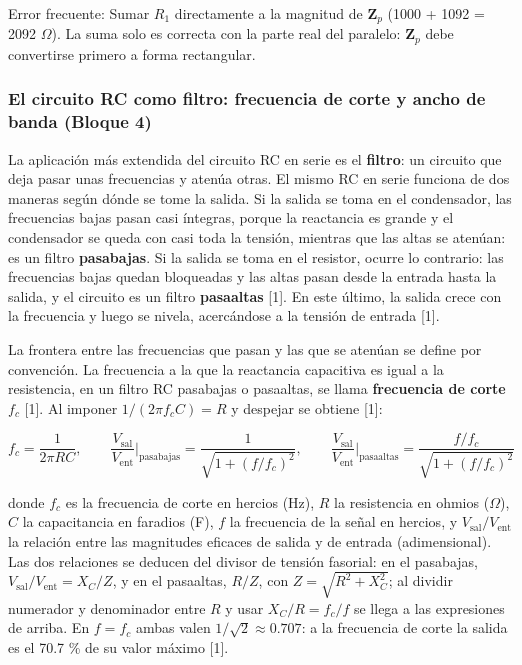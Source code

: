 \documentclass[11pt,letterpaper]{article}
\begin{document}
\begin{nota}{Error frecuente:}
Sumar $R_1$ directamente a la magnitud de $\mathbf{Z}_p$ (1000 + 1092 = 2092 \ensuremath{\Omega}). La suma solo es correcta con la parte real del paralelo: $\mathbf{Z}_p$ debe convertirse primero a forma rectangular.
\end{nota}

\subsubsection{El circuito RC como filtro: frecuencia de corte y ancho de banda (Bloque 4)}

La aplicación más extendida del circuito RC en serie es el \textbf{filtro}: un circuito que deja pasar unas frecuencias y atenúa otras. El mismo RC en serie funciona de dos maneras según dónde se tome la salida. Si la salida se toma en el condensador, las frecuencias bajas pasan casi íntegras, porque la reactancia es grande y el condensador se queda con casi toda la tensión, mientras que las altas se atenúan: es un filtro \textbf{pasabajas}. Si la salida se toma en el resistor, ocurre lo contrario: las frecuencias bajas quedan bloqueadas y las altas pasan desde la entrada hasta la salida, y el circuito es un filtro \textbf{pasaaltas} [1]. En este último, la salida crece con la frecuencia y luego se nivela, acercándose a la tensión de entrada [1].

La frontera entre las frecuencias que pasan y las que se atenúan se define por convención. La frecuencia a la que la reactancia capacitiva es igual a la resistencia, en un filtro RC pasabajas o pasaaltas, se llama \textbf{frecuencia de corte} $f_c$ [1]. Al imponer $1/(2\pi f_c C) = R$ y despejar se obtiene [1]:

\begin{equation}
  f_c = \frac{1}{2\pi R C}, \qquad \frac{V_{\mathrm{sal}}}{V_{\mathrm{ent}}}\bigg|_{\mathrm{pasabajas}} = \frac{1}{\sqrt{1 + (f/f_c)^{2}}}, \qquad \frac{V_{\mathrm{sal}}}{V_{\mathrm{ent}}}\bigg|_{\mathrm{pasaaltas}} = \frac{f/f_c}{\sqrt{1 + (f/f_c)^{2}}}
\end{equation}

donde $f_c$ es la frecuencia de corte en hercios (Hz), $R$ la resistencia en ohmios (\ensuremath{\Omega}), $C$ la capacitancia en faradios (F), $f$ la frecuencia de la señal en hercios, y $V_{\mathrm{sal}}/V_{\mathrm{ent}}$ la relación entre las magnitudes eficaces de salida y de entrada (adimensional). Las dos relaciones se deducen del divisor de tensión fasorial: en el pasabajas, $V_{\mathrm{sal}}/V_{\mathrm{ent}} = X_C/Z$, y en el pasaaltas, $R/Z$, con $Z = \sqrt{R^2 + X_C^2}$; al dividir numerador y denominador entre $R$ y usar $X_C/R = f_c/f$ se llega a las expresiones de arriba. En $f = f_c$ ambas valen $1/\sqrt{2} \approx 0.707$: a la frecuencia de corte la salida es el 70.7 \% de su valor máximo [1].
\end{document}
